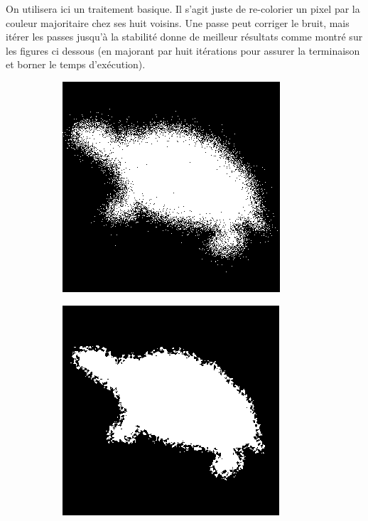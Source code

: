\documentclass{article}
\theoremstyle{definition}
\begin{document}
    On utilisera ici un traitement basique. Il s'agit juste de re-colorier un pixel par la couleur majoritaire chez ses huit voisins. Une passe peut corriger le bruit, mais itérer les passes jusqu'à la stabilité donne de meilleur résultats comme montré sur les figures ci dessous (en majorant par huit itérations pour assurer la terminaison et borner le temps d'exécution).
    
     \begin{figure}[!h]
	\centering
	  \begin{subfigure}{.24\textwidth}
	    \centering
	    \includegraphics[scale=0.3]{Illustrations/turtle-1-bruit.png}
	    \label{butterfly-rempli}
	  \end{subfigure}
	  \begin{subfigure}{.24\textwidth}
	    \centering
	    \includegraphics[scale=0.3]{Illustrations/turtle-1-bruit1.png}
	    \label{spirale-rempli}
	  \end{subfigure}
	  \begin{subfigure}{.24\textwidth}
	    \centering

\end{subfigure}
\end{figure}
\end{document}
